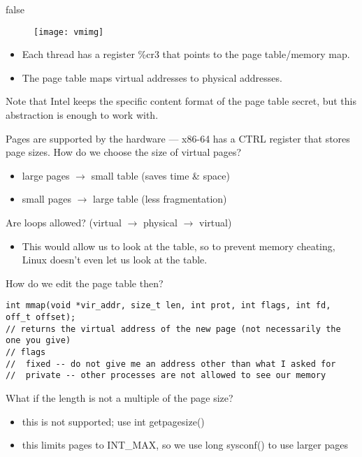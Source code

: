 \documentclass[../../lecture_notes.tex]{subfiles}
\begin{document}
\if false
\begin{figure}[h!]
	\texttt{[image: vmimg]}
\end{figure}
\fi
\begin{itemize} 
\item Each thread has a register \%cr3 that points to the page table/memory map.
\item The page table maps virtual addresses to physical addresses.
\end{itemize}
Note that Intel keeps the specific content format of the page table secret, but this abstraction is enough to work with.


Pages are supported by the hardware --- x86-64 has a CTRL register that stores page sizes. How do we choose the size of virtual pages?
\begin{itemize}
\item large pages $\to$ small table (saves time \& space)
\item small pages $\to$ large table (less fragmentation)
\end{itemize}

Are loops allowed? (virtual $\to$ physical $\to$ virtual)
\begin{itemize}
\item This would allow us to look at the table, so to prevent memory cheating, Linux doesn’t even let us look at the table.
\end{itemize}

How do we edit the page table then?
\begin{lstlisting}
int mmap(void *vir_addr, size_t len, int prot, int flags, int fd, off_t offset);
// returns the virtual address of the new page (not necessarily the one you give)
// flags 
// 	fixed -- do not give me an address other than what I asked for
// 	private -- other processes are not allowed to see our memory
\end{lstlisting}

What if the length is not a multiple of the page size?
\begin{itemize}
	\item this is not supported; use int getpagesize()
	\item this limits pages to INT\_MAX, so we use long sysconf() to use larger pages
\end{itemize}
\end{document}
